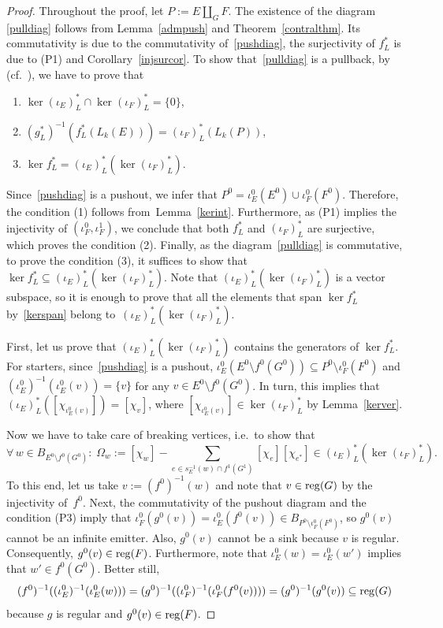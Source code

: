 \documentclass[12pt,times,a4paper]{amsart}
\numberwithin{equation}{section}
\numberwithin{equation}{section}
\begin{document}
\begin{proof}
Throughout the proof, let $P:=E\amalg_GF$. 
The existence of the diagram \eqref{pulldiag} follows from Lemma~\ref{admpush} and Theorem~\ref{contralthm}.
Its commutativity is due to the commutativity of~\eqref{pushdiag}, the surjectivity of $f^*_L$ is due to (P1) and Corollary~\ref{injsurcor}.
To show that~\eqref{pulldiag} is a pullback,
 by~\cite[Proposition~3.1]{gk-p99} (cf.~\cite[Lemma~4.1]{hkt20}), we have to prove that
\begin{enumerate}
\item[(1)] $\ker(\iota_E)^*_L\cap\ker(\iota_F)^*_L=\{0\}$,
\item[(2)] $(g^*_L)^{-1}(f^*_L(L_k(E)))=(\iota_F)^*_L(L_k(P))$,
\item[(3)] $\ker f^*_L=(\iota_E)^*_L(\ker(\iota_F)^*_L)$.
\end{enumerate}
Since~\eqref{pushdiag} is a pushout, we infer that $P^0=\iota_E^0(E^0)\cup\iota_F^0(F^0)$.
Therefore, the condition (1) follows from~Lemma~\ref{kerint}. Furthermore, as (P1) implies the injectivity of 
$(\iota_F^0,\iota_F^1)$, we conclude that
both $f^*_L$ and $(\iota_F)^*_L$ are surjective, which proves the condition (2). Finally, as the diagram~\eqref{pulldiag} is 
commutative, to prove the condition (3), it suffices to show that $\ker f^*_L\subseteq (\iota_E)^*_L(\ker(\iota_F)^*_L)$. Note that 
$(\iota_E)^*_L(\ker(\iota_F)^*_L)$ is a vector subspace, so it is enough to prove that all the elements that span $\ker f^*_L$ 
by~\eqref{kerspan} belong to~$(\iota_E)^*_L(\ker(\iota_F)^*_L)$. 

First, let us prove that $(\iota_E)^*_L(\ker(\iota_F)^*_L)$ contains the generators of $\ker f^*_L$. 
For starters, since~\eqref{pushdiag} is a pushout, $\iota_E^0(E^0\setminus f^0(G^0))\subseteq P^0\setminus\iota_F^0(F^0)$ 
and $(\iota_E^0)^{-1}(\iota_E^0(v))=\{v\}$ for any $v\in E^0\setminus f^0(G^0)$.
In turn, this implies that $(\iota_E)^*_L([\chi_{\iota_E^0(v)}])=[\chi_v]$, 
where $[\chi_{\iota_E^0(v)}]\in\ker(\iota_F)^*_L$ by Lemma~\ref{kerver}. 

Now we have to take care of breaking vertices, i.e.\ to show that
\begin{equation}
\forall\, w\in B_{E^0\setminus f^0(G^0)}\colon\;\Omega_w:=[\chi_w]-\!\!\!\!\!\!\!\!\!\!\!\!\sum_{e\in s^{-1}_E(w)\cap f^1(G^1)}\!\!\!\!\!\!\!\!\!\!\!\!
[\chi_e][\chi_{e^*}]
\in (\iota_E)^*_L(\ker(\iota_F)^*_L).
\end{equation}
To this end, let us take $v:=(f^0)^{-1}(w)$ and note that $v\in {\rm reg}(G)$ by the injectivity of~$f^0$. 
Next, the commutativity of the pushout diagram and the condition (P3)  imply that 
 $\iota_F^0(g^0(v))=\iota_E^0(f^0(v))\in B_{P^0\setminus \iota_F^0(F^0)}$, so $g^0(v)$ cannot be an infinite emitter. Also, 
$g^0(v)$ cannot be a 
sink because $v$ is regular. Consequently, $g^0(v)\in {\rm reg}(F)$. Furthermore, note that $\iota_E^0(w)=\iota_E^0(w')$ implies that $w'\in f^0(G^0)$. 
Better still, 
\begin{equation}\label{star}
(f^0)^{-1}((\iota_E^0)^{-1}(\iota_E^0(w)))=(g^0)^{-1}((\iota_F^0)^{-1}(\iota_F^0(f^0(v))))=(g^0)^{-1}(g^0(v))\subseteq {\rm reg}(G)
\end{equation}
because $g$ is regular and $g^0(v)\in{\rm reg}(F)$. 


\end{proof}
\end{document}
